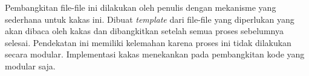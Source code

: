 Pembangkitan file-file ini dilakukan oleh penulis dengan mekanisme yang sederhana untuk kakas ini.
Dibuat \textit{template} dari file-file yang diperlukan yang akan dibaca oleh kakas dan dibangkitkan setelah semua proses sebelumnya selesai.
Pendekatan ini memiliki kelemahan karena proses ini tidak dilakukan secara modular.
Implementasi kakas menekankan pada pembangkitan kode yang modular saja.